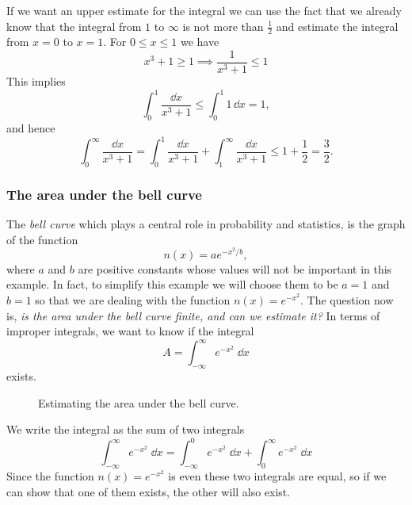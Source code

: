 If we want an upper estimate for the integral we can use the fact that we
already know that the integral from $1$ to $\infty$ is not more than $\frac12$
and estimate the integral from $x=0$ to $x=1$.  For $0\leq x\leq 1$ we have
\[
x^3+1 \geq 1 \implies \frac{1} {x^3+1} \leq 1
\]
This implies
\[
\int_0^1 \frac{\dd x} {x^3 + 1} \leq \int _0^1 1\, \dd x =1,
\]
and hence
\[
\int_0^\infty\frac{\dd x} {x^3 + 1} =
\int_0^1 \frac{\dd x} {x^3+1} +
\int_1^\infty \frac{\dd x} {x^3+1}
\leq 1+ \frac{1} {2} = \frac{3} {2}.
\]


\subsubsection{The area under the bell curve}
\label{sec:01area-under-bell-curve}
The \emph{bell curve} which plays a central role in probability and statistics,
is the graph of the function
\[
n(x) = a e^{-x^2/b},
\]
where $a$ and $b$ are positive constants whose values will not be important in
this example.  In fact, to simplify this example we will choose them to be $a=1$
and $b=1$ so that we are dealing with the function $n(x) = e^{-x^2}$.  The
question now is, \textit{is the area under the bell curve finite, and can we
estimate it?}  In terms of improper integrals, we want to know if the integral
\[
A = \int_{-\infty}^\infty e^{-x^2}\;\dd x
\]
exists.

\begin{figure}[b]
  \centering 
  \caption{Estimating the area under the bell curve.}
  \label{fig:area-under-bell-curve}
\end{figure}


We write the integral as the sum of two integrals
\[
\int_{-\infty}^\infty e^{-x^2}\;\dd x = \int_{-\infty}^0 e^{-x^2}\;\dd
x + \int_{0}^\infty e^{-x^2}\;\dd x
\]
Since the function $n(x) = e^{-x^2}$ is even these two integrals are equal, so
if we can show that one of them exists, the other will also exist.

